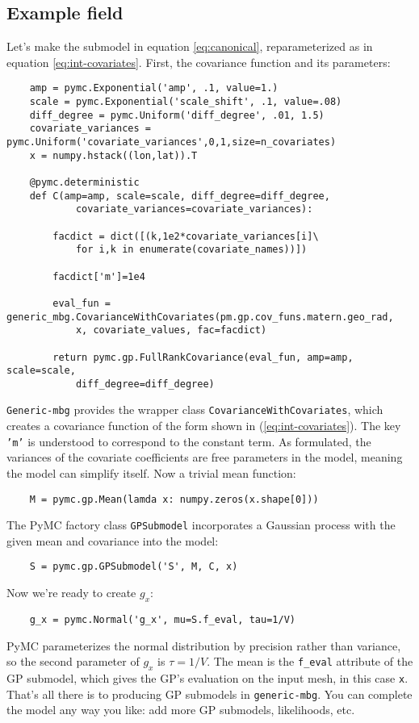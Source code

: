 \subsection{Example field}
\label{sub:example} 

Let's make the submodel in equation \ref{eq:canonical}, reparameterized as in equation \ref{eq:int-covariates}. First, the covariance function and its parameters:
\begin{verbatim}
    amp = pymc.Exponential('amp', .1, value=1.)
    scale = pymc.Exponential('scale_shift', .1, value=.08)
    diff_degree = pymc.Uniform('diff_degree', .01, 1.5)
    covariate_variances = pymc.Uniform('covariate_variances',0,1,size=n_covariates)
    x = numpy.hstack((lon,lat)).T
    
    @pymc.deterministic
    def C(amp=amp, scale=scale, diff_degree=diff_degree, 
            covariate_variances=covariate_variances):

        facdict = dict([(k,1e2*covariate_variances[i]\
            for i,k in enumerate(covariate_names))])
            
        facdict['m']=1e4

        eval_fun = generic_mbg.CovarianceWithCovariates(pm.gp.cov_funs.matern.geo_rad,
            x, covariate_values, fac=facdict)

        return pymc.gp.FullRankCovariance(eval_fun, amp=amp, scale=scale, 
            diff_degree=diff_degree)
\end{verbatim}
\texttt{Generic-mbg} provides the wrapper class \texttt{CovarianceWithCovariates}, which creates a covariance function of the form shown in (\ref{eq:int-covariates}). The key \texttt{'m'} is understood to correspond to the constant term. As formulated, the variances of the covariate coefficients are free parameters in the model, meaning the model can simplify itself. Now a trivial mean function:
\begin{verbatim}
    M = pymc.gp.Mean(lamda x: numpy.zeros(x.shape[0]))
\end{verbatim}

The PyMC factory class \texttt{GPSubmodel} incorporates a Gaussian process with the given mean and covariance into the model:
\begin{verbatim}
    S = pymc.gp.GPSubmodel('S', M, C, x)
\end{verbatim}

Now we're ready to create $g_x$:
\begin{verbatim}
    g_x = pymc.Normal('g_x', mu=S.f_eval, tau=1/V)
\end{verbatim}
PyMC parameterizes the normal distribution by precision rather than variance, so the second parameter of $g_x$ is $\tau=1/V$. The mean is the \texttt{f\_eval} attribute of the GP submodel, which gives the GP's evaluation on the input mesh, in this case \texttt{x}. That's all there is to producing GP submodels in \texttt{generic-mbg}. You can complete the model any way you like: add more GP submodels, likelihoods, etc.


